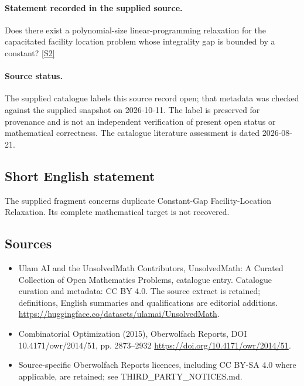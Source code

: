 \documentclass[11pt]{article}
\newcommand{\sref}[2]{\hyperlink{source:#1:#2}{[S#2]}}
\begin{document}
\paragraph{Statement recorded in the supplied source.}
Does there exist a polynomial-size linear-programming relaxation for the capacitated facility location problem whose integrality gap is bounded by a constant? \sref{statement}{2}
\paragraph{Source status.}
The supplied catalogue labels this source record open; that metadata was checked against the supplied snapshot on 2026-10-11. The label is preserved for provenance and is not an independent verification of present open status or mathematical correctness. The catalogue literature assessment is dated 2026-08-21.
\subsection{Short English statement}
The supplied fragment concerns duplicate Constant-Gap Facility-Location Relaxation. Its complete mathematical target is not recovered.
\subsection{Sources}
\begin{itemize}
\item[\hypertarget{source:statement:1}{S1}] Ulam AI and the UnsolvedMath Contributors, UnsolvedMath: A Curated Collection of Open Mathematics Problems, catalogue entry. Catalogue curation and metadata: CC BY 4.0. The source extract is retained; definitions, English summaries and qualifications are editorial additions.
\url{https://huggingface.co/datasets/ulamai/UnsolvedMath}.
\item[\hypertarget{source:statement:2}{S2}] Combinatorial Optimization (2015), Oberwolfach Reports, DOI 10.4171/owr/2014/51, pp. 2873--2932
\url{https://doi.org/10.4171/owr/2014/51}.
\item Source-specific Oberwolfach Reports licences, including CC BY-SA 4.0 where applicable, are retained; see THIRD\_PARTY\_NOTICES.md.
\end{itemize}
\end{document}
